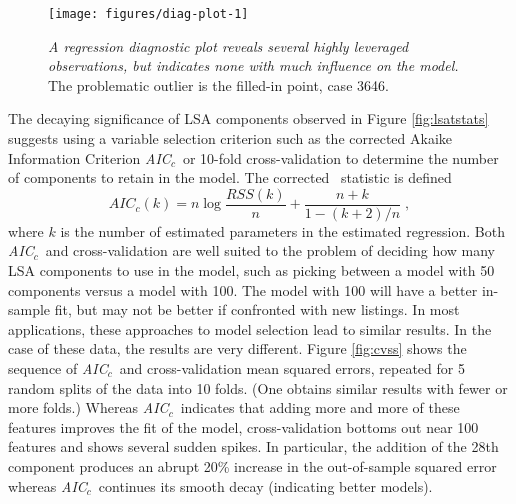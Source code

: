 \documentclass[12pt]{article}\usepackage[]{graphicx}\usepackage[]{color}
\makeatletter
\newenvironment{kframe}{%
 \def\at@end@of@kframe{}%
 \ifinner\ifhmode%
  \def\at@end@of@kframe{\end{minipage}}%
  \begin{minipage}{\columnwidth}%
 \fi\fi%
 \def\FrameCommand##1{\hskip\@totalleftmargin \hskip-\fboxsep
 \colorbox{shadecolor}{##1}\hskip-\fboxsep
     \hskip-\linewidth \hskip-\@totalleftmargin \hskip\columnwidth}%
 \MakeFramed {\advance\hsize-\width
   \@totalleftmargin\z@ \linewidth\hsize
   \@setminipage}}%
 {\par\unskip\endMakeFramed%
 \at@end@of@kframe}
\newenvironment{knitrout}{}{} %
\newcommand{\aicc}{\mbox{\it AIC$_c$}}
\makeatother
\begin{document}
\begin{figure}
\begin{knitrout}
\color{fgcolor}\begin{kframe}


{\ttfamily\noindent\color{warningcolor}{\#\# Warning in sqrt(crit * p * (1 - hh)/hh): NaNs produced}}

{\ttfamily\noindent\color{warningcolor}{\#\# Warning in sqrt(crit * p * (1 - hh)/hh): NaNs produced}}\end{kframe}

{\centering \texttt{[image: figures/diag-plot-1]} 

}



\end{knitrout}

\caption{  \label{fig:diagplot}
 {\sl A regression diagnostic plot reveals several highly leveraged
 observations, but indicates none with much influence on the model. }
  The problematic outlier is the filled-in point, case 3646.}
\end{figure}


 The decaying significance of LSA components observed in Figure
 \ref{fig:lsatstats} suggests using a variable selection criterion
 such as the corrected Akaike Information Criterion \aicc\ or 10-fold
 cross-validation to determine the number of components to retain in
 the model.  The corrected \aic\ statistic is defined \citep{hurvich89}
 \begin{equation}
    AIC_{c}(k) = n \log \frac{RSS(k)}{n} + \frac{n+k}{1-(k+2)/n} \;,
 \end{equation}
 where $k$ is the number of estimated parameters in the estimated
 regression.  Both \aicc\ and cross-validation are well suited to the
 problem of deciding how many LSA components to use in the model, such
 as picking between a model with 50 components versus a model with
 100.  The model with 100 will have a better in-sample fit, but may
 not be better if confronted with new listings.  In most applications,
 these approaches to model selection lead to similar results.  In the
 case of these data, the results are very different.  Figure
 \ref{fig:cvss} shows the sequence of \aicc\ and cross-validation mean
 squared errors, repeated for 5 random splits of the data into 10
 folds.  (One obtains similar results with fewer or more folds.)
  Whereas \aicc\ indicates that adding more and more of these features
 improves the fit of the model, cross-validation bottoms out near 100
 features and shows several sudden spikes.  In particular, the
 addition of the 28th component produces an abrupt 20\% increase in
 the out-of-sample squared error whereas \aicc\ continues its smooth
 decay (indicating better models).
\end{document}
